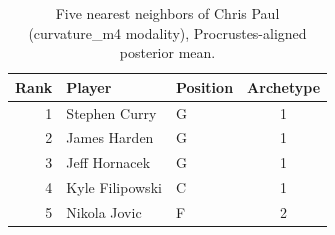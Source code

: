 \begin{table}[htbp]
  \centering\small
  \begin{tabular}{rllc}
    \toprule
    Rank & Player & Position & Archetype \\
    \midrule
    1 & Stephen Curry & G & 1 \\
    2 & James Harden & G & 1 \\
    3 & Jeff Hornacek & G & 1 \\
    4 & Kyle Filipowski & C & 1 \\
    5 & Nikola Jovic & F & 2 \\
    \bottomrule
  \end{tabular}
  \caption{Five nearest neighbors of Chris Paul (curvature_m4 modality), Procrustes-aligned posterior mean.}
  \label{tab:Chris_Paul_neighbors_curvature_m4}
\end{table}

